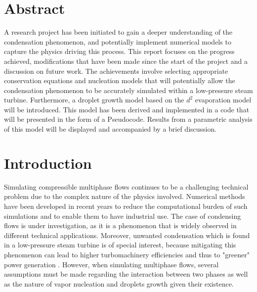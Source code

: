 \documentclass[12pt]{article}
\begin{document}
 
\newpage

\section*{Abstract}
A research project has been initiated to gain a deeper understanding of the condensation phenomenon, and potentially implement numerical models to capture the physics driving this process. This report focuses on the progress achieved, modifications that have been made since the start of the project and a discussion on future work. The achievements involve selecting appropriate conservation equations and nucleation models that will potentially allow the condensation phenomenon to be accurately simulated within a low-pressure steam turbine. Furthermore, a droplet growth model based on the $d^2$ evaporation model will be introduced. This model has been derived and implemented in a code that will be presented in the form of a Pseudocode. Results from a parametric analysis of this model will be displayed and accompanied by a brief discussion. 
\thispagestyle{empty}
\newpage
\hypersetup{linkcolor=black}
    \tableofcontents

\thispagestyle{empty}


\listoffigures

\newpage


\section{Introduction}
Simulating compressible multiphase flows continues to be a challenging technical problem due to the complex nature of the physics involved. Numerical methods have been developed in recent years to reduce the computational burden of such simulations and to enable them to have industrial use. The case of condensing flows is under investigation, as it is a phenomenon that is widely observed in different technical applications. Moreover, unwanted condensation which is found in a low-pressure steam turbine is of special interest, because mitigating this phenomenon can lead to higher turbomachinery efficiencies and thus to "greener" power generation \cite{francesco2017cfd}. However, when simulating multiphase flows, several assumptions must be made regarding the interaction between two phases as well as the nature of vapor nucleation and droplets growth given their existence. 
\end{document}
